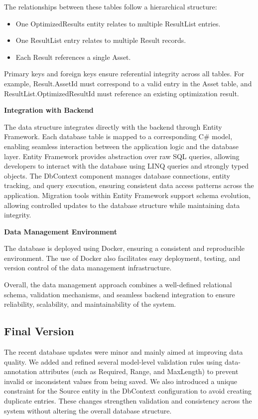 The relationships between these tables follow a hierarchical structure:
\begin{itemize}
\item One OptimizedResults entity relates to multiple ResultList entries.
\item One ResultList entry relates to multiple Result records.
\item Each Result references a single Asset.
\end{itemize}

\hspace*{1cm}Primary keys and foreign keys ensure referential integrity across all tables. For example, Result.AssetId must correspond to a valid entry in the Asset table, and ResultList.OptimizedResultId must reference an existing optimization result.

\textbf{Integration with Backend}

\hspace*{1cm}The data structure integrates directly with the backend through Entity Framework. Each database table is mapped to a corresponding C\# model, enabling seamless interaction between the application logic and the database layer. Entity Framework provides abstraction over raw SQL queries, allowing developers to interact with the database using LINQ queries and strongly typed objects. The DbContext component manages database connections, entity tracking, and query execution, ensuring consistent data access patterns across the application. Migration tools within Entity Framework support schema evolution, allowing controlled updates to the database structure while maintaining data integrity.

\textbf{Data Management Environment}

\hspace*{1cm}The database is deployed using Docker, ensuring a consistent and reproducible environment. The use of Docker also facilitates easy deployment, testing, and version control of the data management infrastructure.

\hspace*{1cm}Overall, the data management approach combines a well-defined relational schema, validation mechanisms, and seamless backend integration to ensure reliability, scalability, and maintainability of the system.

\subsection{Final Version}

\hspace*{1cm}The recent database updates were minor and mainly aimed at improving data quality. We added and refined several model-level validation rules using data-annotation attributes (such as Required, Range, and MaxLength) to prevent invalid or inconsistent values from being saved. We also introduced a unique constraint for the Source entity in the DbContext configuration to avoid creating duplicate entries. These changes strengthen validation and consistency across the system without altering the overall database structure.
